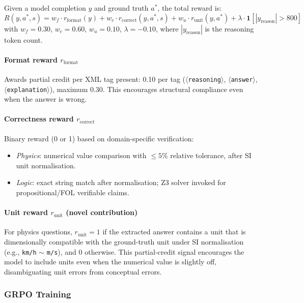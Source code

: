 \documentclass{ieeeaccess}
\begin{document}
Given a model completion $y$ and ground truth $a^*$, the total reward is:
\begin{equation}
  R(y, a^*, s) =
    w_f \cdot r_{\text{format}}(y)
  + w_c \cdot r_{\text{correct}}(y, a^*, s)
  + w_u \cdot r_{\text{unit}}(y, a^*)
  + \lambda \cdot \mathbf{1}[|y_{\text{reason}}| > 800]
  \label{eq:reward}
\end{equation}
with $w_f = 0.30$, $w_c = 0.60$, $w_u = 0.10$, $\lambda = -0.10$,
where $|y_{\text{reason}}|$ is the reasoning token count.

\paragraph{Format reward $r_{\text{format}}$}
Awards partial credit per XML tag present: 0.10 per tag
($\langle$\texttt{reasoning}$\rangle$, $\langle$\texttt{answer}$\rangle$,
$\langle$\texttt{explanation}$\rangle$), maximum 0.30.
This encourages structural compliance even when the answer is wrong.

\paragraph{Correctness reward $r_{\text{correct}}$}
Binary reward (0 or 1) based on domain-specific verification:
\begin{itemize}
  \item \emph{Physics}: numerical value comparison with
        $\leq 5\%$ relative tolerance, after SI unit normalisation.
  \item \emph{Logic}: exact string match after normalisation; Z3 solver
        invoked for propositional/FOL verifiable claims.
\end{itemize}

\paragraph{Unit reward $r_{\text{unit}}$ (novel contribution)}
For physics questions, $r_{\text{unit}} = 1$ if the extracted answer contains
a unit that is dimensionally compatible with the ground-truth unit under
SI normalisation (e.g., \texttt{km/h} $\sim$ \texttt{m/s}), and $0$
otherwise.
This partial-credit signal encourages the model to include units even when
the numerical value is slightly off, disambiguating unit errors from
conceptual errors.

\subsubsection{GRPO Training}
\end{document}
